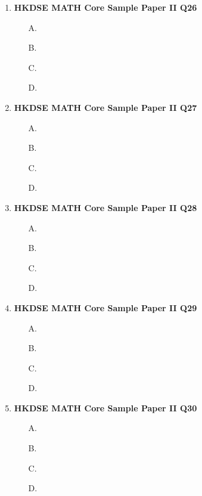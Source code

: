 \documentclass[12pt]{article}
\begin{document}
\begin{enumerate}
	\begin{enumerate}
		\item[A.]
		\item[B.]
		\item[C.]
		\item[D.]
	\end{enumerate}
	\item \textbf{HKDSE MATH Core Sample Paper II Q26}\\
	\begin{enumerate}
		\item[A.]
		\item[B.]
		\item[C.]
		\item[D.]
	\end{enumerate}
	\item \textbf{HKDSE MATH Core Sample Paper II Q27}\\
	\begin{enumerate}
		\item[A.]
		\item[B.]
		\item[C.]
		\item[D.]
	\end{enumerate}
	\item \textbf{HKDSE MATH Core Sample Paper II Q28}\\
	\begin{enumerate}
		\item[A.]
		\item[B.]
		\item[C.]
		\item[D.]
	\end{enumerate}
	\item \textbf{HKDSE MATH Core Sample Paper II Q29}\\
	\begin{enumerate}
		\item[A.]
		\item[B.]
		\item[C.]
		\item[D.]
	\end{enumerate}
	\item \textbf{HKDSE MATH Core Sample Paper II Q30}\\
	\begin{enumerate}
		\item[A.]
		\item[B.]
		\item[C.]
		\item[D.]
	\end{enumerate}

\end{enumerate}
\end{document}
